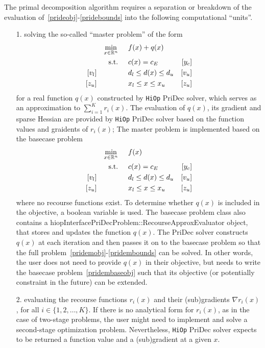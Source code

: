 \documentclass[11pt]{article}
\newcommand{\Hi}{\texttt{HiOp}\xspace}
\begin{document}
The primal decomposition algorithm requires a separation or breakdown of the evaluation of~\eqref{prideobj}-\eqref{pridebounds} into the following computational ``units''.
\begin{itemize}
\item[1.] solving the so-called ``master problem'' of the form
  \begin{align}
&&&&\min_{x\in\mathbb{R}^n} & \hspace{0.5cm} f(x) + q(x) &&&& \label{pridemobj}\\
&&&&\textnormal{s.t.} &\hspace{0.5cm}  c(x)=c_E &[y_c]&&&\\
&&[v_l]&&& \hspace{0.5cm} d_l \leq d(x) \leq d_u  &[v_u]&&&\label{pridemineq} \\
&&[z_u]&&& \hspace{0.5cm} x_l \leq x \leq x_u & [z_u] &&&\label{pridembounds}
  \end{align}
for a real function $q(x)$ constructed by \Hi PriDec solver, which serves as an approximation to $\sum_{i=1}^K r_i(x)$. The evaluation of $q(x)$, its gradient and sparse Hessian are provided by \Hi PriDec solver based on the function values and graidents of $r_i(x)$; 
The master problem is implemented based on the basecase problem
  \begin{align}
&&&&\min_{x\in\mathbb{R}^n} & \hspace{0.5cm} f(x) &&&& \label{pridembaseobj}\\
&&&&\textnormal{s.t.} &\hspace{0.5cm}  c(x)=c_E &[y_c]&&&\\
&&[v_l]&&& \hspace{0.5cm} d_l \leq d(x) \leq d_u  &[v_u]&&&\label{pridembaseineq} \\
&&[z_u]&&& \hspace{0.5cm} x_l \leq x \leq x_u & [z_u] &&&\label{pridembasebounds}
  \end{align}
		where no recourse functions exist. To determine whether $q(x)$ is included in the objective, a boolean variable is used. The basecase problem class also contains a hiopInterfacePriDecProblem::RecourseApproxEvaluator object, that stores and updates the function $q(x)$. The PriDec solver constructs $q(x)$ at each iteration and then passes it on to the basecase problem so that the full problem~\eqref{pridemobj}-\eqref{pridembounds} can be solved. In other words, the user does not need to provide $q(x)$ in their objective, but needs to write the basecase problem~\eqref{pridembaseobj} such that its objective (or potentially constraint in the future) can be extended. 
	\item[2.] evaluating the recourse functions $r_i(x)$ and their (sub)gradients $\nabla r_i(x)$, for all $i\in\{1,2,\ldots, K\}$. If there is no analytical form for $r_i(x)$, as in the case of two-stage problems, the user might need to implement and solve a second-stage optimization problem. Nevertheless, \Hi PriDec solver expects to be returned a function value and a (sub)gradient at a given $x$.
\end{itemize}
\end{document}
